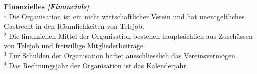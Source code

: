 \documentclass[10pt]{article}
\newcounter{qcounter}
\begin{document}
\begin{list}{{\bf Artikel :~}}{}

\item {\bf Finanzielles {\it[Financials]}}\\
$^{1}$ Die Organisation ist ein nicht wirtschaftlicher Verein und hat unentgeltliches Gastrecht in den R\"aumlichkeiten von Telejob.\\
$^{2}$ Die finanziellen Mittel der Organisation bestehen haupts\"achlich aus Zusch\"ussen von Telejob und freiwillige Mitgliederbeitr\"age.\\
$^{3}$ F\"ur Schulden der Organisation haftet ausschliesslich das Vereinsverm\"ogen.\\
$^{4}$ Das Rechnungsjahr der Organisation ist das Kalenderjahr.\\



\end{list}
\end{document}
